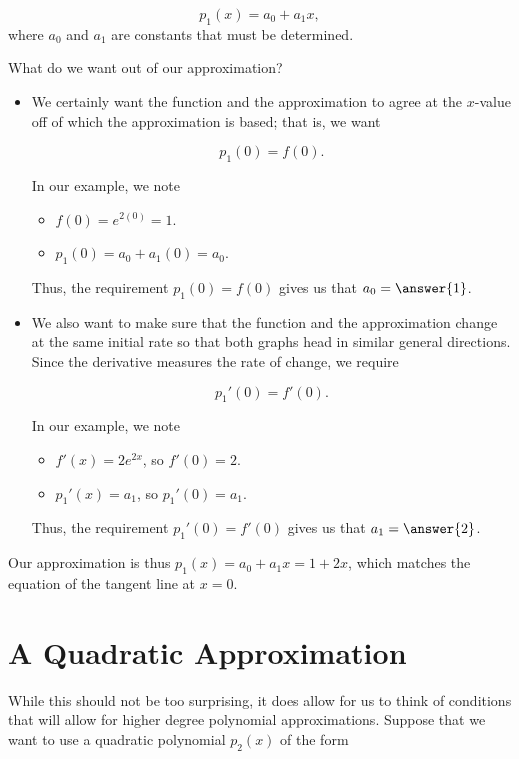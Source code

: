 \documentclass{ximera}
\begin{document}
\[
p_1(x) = a_0+a_1x,
\]
where $a_0$ and $a_1$ are constants that must be determined.
\begin{question}
  What do we want out of our approximation?
\begin{explanation}
\begin{itemize}
\item We certainly want the function and the approximation to agree at
  the $x$-value off of which the approximation is based; that is, we
  want

\[
p_1(0) =f(0).
\]

In our example, we note

\begin{itemize}
\item $f(0) = e^{2(0)} =1$.
\item $p_1(0) = a_0+a_1(0) = a_0$.
\end{itemize}
Thus, the requirement $p_1(0) =f(0)$ gives us that $a_0=\answer{1}$.
 
\item We also want to make sure that the function and the approximation change at the same initial rate so that both graphs head in similar general directions.  Since the derivative measures the rate of change, we require

\[
p_1'(0) =f'(0).
\] 

In our example, we note

\begin{itemize}
\item $f'(x) = 2e^{2x}$, so $f'(0) = 2$.
\item $p_1'(x) = a_1$, so $p_1'(0) = a_1$.
\end{itemize}
Thus, the requirement $p_1'(0) =f'(0)$ gives us that $a_1=\answer{2}$.

\end{itemize}

Our approximation is thus $p_1(x) = a_0+a_1x = 1+2x$, which matches the equation of the tangent line at $x=0$.
\end{explanation}
\end{question}

\section{A Quadratic Approximation}

While this should not be too surprising, it does allow for us to think
of conditions that will allow for higher degree polynomial
approximations.  Suppose that we want to use a quadratic polynomial
$p_2(x)$ of the form
\end{document}
